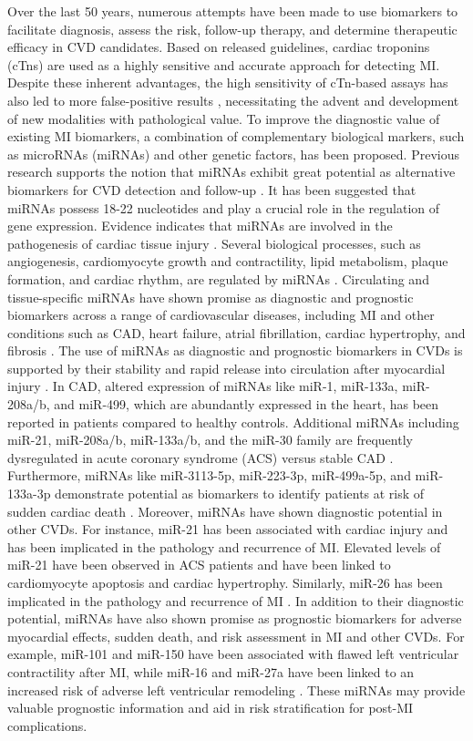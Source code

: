 \documentclass[sn-mathphys,Numbered]{sn-jnl}%
\theoremstyle{thmstyleone}%
\theoremstyle{thmstyletwo}%
\theoremstyle{thmstylethree}%
\begin{document}
Over the last 50 years, numerous attempts have been made to use
biomarkers to facilitate diagnosis, assess the risk, follow-up therapy, and determine therapeutic efficacy in CVD candidates. Based on released
guidelines, cardiac troponins (cTns) are used as a highly sensitive and
accurate approach for detecting MI. Despite these inherent advantages,
the high sensitivity of cTn-based assays has also led to more
false-positive results \cite{17}, necessitating the advent
and development of new modalities with pathological value. To improve
the diagnostic value of existing MI biomarkers, a combination of
complementary biological markers, such as microRNAs (miRNAs) and other
genetic factors, has been proposed. Previous research supports the
notion that miRNAs exhibit great potential as alternative biomarkers for
CVD detection and follow-up \cite{miR}. It has been suggested
that miRNAs possess 18-22 nucleotides and play a crucial role in the
regulation of gene expression. Evidence indicates that miRNAs are
involved in the pathogenesis of cardiac tissue injury \cite{m1}. Several biological processes, such as angiogenesis, cardiomyocyte growth and contractility, lipid metabolism, plaque
formation, and cardiac rhythm, are regulated by miRNAs \cite{m2}. 
Circulating and tissue-specific miRNAs have shown promise as diagnostic and prognostic biomarkers across a range of cardiovascular diseases, including MI and other conditions such as CAD, heart failure, atrial fibrillation, cardiac hypertrophy, and fibrosis \cite{11-15, new2}. The use of miRNAs as diagnostic and prognostic biomarkers in CVDs is supported by their stability and rapid release into circulation after myocardial injury \cite{11-15}. In CAD, altered expression of miRNAs like miR-1, miR-133a, miR-208a/b, and miR-499, which are abundantly expressed in the heart, has been reported in patients compared to healthy controls. Additional miRNAs including miR-21, miR-208a/b, miR-133a/b, and the miR-30 family are frequently dysregulated in acute coronary syndrome (ACS) versus stable CAD  \cite{new3}. Furthermore, miRNAs like miR-3113-5p, miR-223-3p, miR-499a-5p, and miR-133a-3p demonstrate potential as biomarkers to identify patients at risk of sudden cardiac death \cite{new4}. Moreover, miRNAs have shown diagnostic potential in other CVDs. For instance, miR-21 has been associated with cardiac injury and has been implicated in the pathology and recurrence of MI. Elevated levels of miR-21 have been observed in ACS patients and have been linked to cardiomyocyte apoptosis and cardiac hypertrophy. Similarly, miR-26 has been implicated in the pathology and recurrence of MI \cite{new5}. In addition to their diagnostic potential, miRNAs have also shown promise as prognostic biomarkers for adverse myocardial effects, sudden death, and risk assessment in MI and other CVDs. For example, miR-101 and miR-150 have been associated with flawed left ventricular contractility after MI, while miR-16 and miR-27a have been linked to an increased risk of adverse left ventricular remodeling \cite{11-15, new3}. These miRNAs may provide valuable prognostic information and aid in risk stratification for post-MI complications.
 
\end{document}
